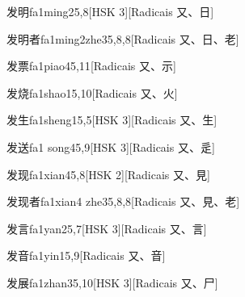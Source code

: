 \begin{entry}{发明}{fa1ming2}{5,8}[HSK 3][Radicais ⼜、⽇]
\end{entry}

\begin{entry}{发明者}{fa1ming2zhe3}{5,8,8}[Radicais ⼜、⽇、⽼]
\end{entry}

\begin{entry}{发票}{fa1piao4}{5,11}[Radicais ⼜、⽰]
\end{entry}

\begin{entry}{发烧}{fa1shao1}{5,10}[Radicais ⼜、⽕]
\end{entry}

\begin{entry}{发生}{fa1sheng1}{5,5}[HSK 3][Radicais ⼜、⽣]
\end{entry}

\begin{entry}{发送}{fa1 song4}{5,9}[HSK 3][Radicais ⼜、⾡]
\end{entry}

\begin{entry}{发现}{fa1xian4}{5,8}[HSK 2][Radicais ⼜、⾒]
\end{entry}

\begin{entry}{发现者}{fa1xian4 zhe3}{5,8,8}[Radicais ⼜、⾒、⽼]
\end{entry}

\begin{entry}{发言}{fa1yan2}{5,7}[HSK 3][Radicais ⼜、⾔]
\end{entry}

\begin{entry}{发音}{fa1yin1}{5,9}[Radicais ⼜、⾳]
\end{entry}

\begin{entry}{发展}{fa1zhan3}{5,10}[HSK 3][Radicais ⼜、⼫]
\end{entry}

